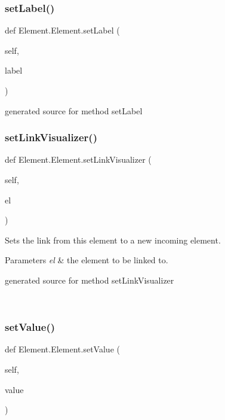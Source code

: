 \subsubsection{\texorpdfstring{set\+Label()}{setLabel()}}
{\footnotesize\ttfamily def Element.\+Element.\+set\+Label (\begin{DoxyParamCaption}\item[{}]{self,  }\item[{}]{label }\end{DoxyParamCaption})}

\begin{DoxyVerb}generated source for method setLabel \end{DoxyVerb}
 \hypertarget{class_element_1_1_element_a6aac3e4778ae009406417439c778f904}{}\label{class_element_1_1_element_a6aac3e4778ae009406417439c778f904} 
\subsubsection{\texorpdfstring{set\+Link\+Visualizer()}{setLinkVisualizer()}}
{\footnotesize\ttfamily def Element.\+Element.\+set\+Link\+Visualizer (\begin{DoxyParamCaption}\item[{}]{self,  }\item[{}]{el }\end{DoxyParamCaption})}



Sets the link from this element to a new incoming element. 


\begin{DoxyParams}{Parameters}
{\em el} & the element to be linked to.\begin{DoxyVerb}generated source for method setLinkVisualizer \end{DoxyVerb}
 \\
\hline
\end{DoxyParams}
\hypertarget{class_element_1_1_element_a267a7f5770e823ca3b6e5bc88fa6dfa9}{}\label{class_element_1_1_element_a267a7f5770e823ca3b6e5bc88fa6dfa9} 
\subsubsection{\texorpdfstring{set\+Value()}{setValue()}}
{\footnotesize\ttfamily def Element.\+Element.\+set\+Value (\begin{DoxyParamCaption}\item[{}]{self,  }\item[{}]{value }\end{DoxyParamCaption})}


